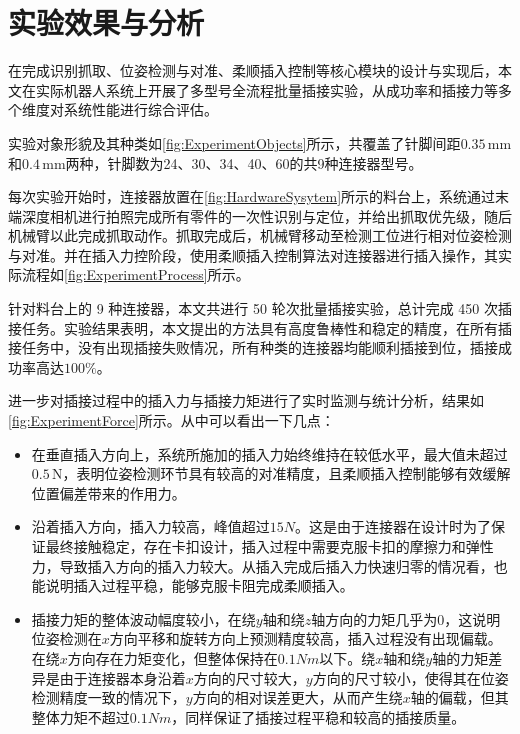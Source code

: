\documentclass{Diploma}
\begin{document}
\section{实验效果与分析}
在完成识别抓取、位姿检测与对准、柔顺插入控制等核心模块的设计与实现后，本文在实际机器人系统上开展了多型号全流程批量插接实验，从成功率和插接力等多个维度对系统性能进行综合评估。

实验对象形貌及其种类如\ref{fig:ExperimentObjects}所示，共覆盖了针脚间距$0.35\,\mathrm{mm}$和$0.4\,\mathrm{mm}$两种，针脚数为24、30、34、40、60的共9种连接器型号。

%

每次实验开始时，连接器放置在\ref{fig:HardwareSysytem}所示的料台上，系统通过末端深度相机进行拍照完成所有零件的一次性识别与定位，并给出抓取优先级，随后机械臂以此完成抓取动作。抓取完成后，机械臂移动至检测工位进行相对位姿检测与对准。并在插入力控阶段，使用柔顺插入控制算法对连接器进行插入操作，其实际流程如\ref{fig:ExperimentProcess}所示。

%

针对料台上的 9 种连接器，本文共进行 50 轮次批量插接实验，总计完成 450 次插接任务。实验结果表明，本文提出的方法具有高度鲁棒性和稳定的精度，在所有插接任务中，没有出现插接失败情况，所有种类的连接器均能顺利插接到位，插接成功率高达$100\%$。

进一步对插接过程中的插入力与插接力矩进行了实时监测与统计分析，结果如\ref{fig:ExperimentForce}所示。从中可以看出一下几点：

%

\begin{itemize}
  \item 在垂直插入方向上，系统所施加的插入力始终维持在较低水平，最大值未超过 $0.5\,\text{N}$，表明位姿检测环节具有较高的对准精度，且柔顺插入控制能够有效缓解位置偏差带来的作用力。
  \item 沿着插入方向，插入力较高，峰值超过$15N$。这是由于连接器在设计时为了保证最终接触稳定，存在卡扣设计，插入过程中需要克服卡扣的摩擦力和弹性力，导致插入方向的插入力较大。从插入完成后插入力快速归零的情况看，也能说明插入过程平稳，能够克服卡阻完成柔顺插入。
  \item 插接力矩的整体波动幅度较小，在绕$y$轴和绕$z$轴方向的力矩几乎为$0$，这说明位姿检测在$x$方向平移和旋转方向上预测精度较高，插入过程没有出现偏载。在绕$x$方向存在力矩变化，但整体保持在$0.1Nm$以下。绕$x$轴和绕$y$轴的力矩差异是由于连接器本身沿着$x$方向的尺寸较大，$y$方向的尺寸较小，使得其在位姿检测精度一致的情况下，$y$方向的相对误差更大，从而产生绕$x$轴的偏载，但其整体力矩不超过$0.1Nm$，同样保证了插接过程平稳和较高的插接质量。
\end{itemize}
\end{document}
